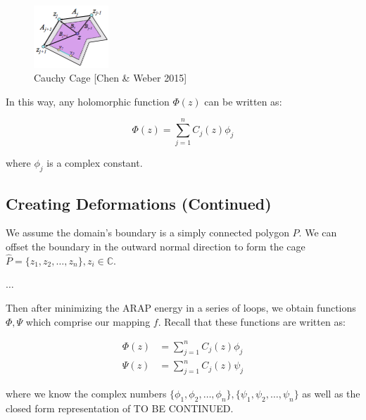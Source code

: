 \begin{figure}[h]
	\centering
	\includegraphics[width=0.25\textwidth]{Images/Cauchy-Cage.png}
	\caption{Cauchy Cage [Chen \& Weber 2015]}
	\label{fig:Cauchy-Cage}
\end{figure}

In this way, any holomorphic function $\Phi(z)$ can be written as:

$$\Phi(z) = \sum_{j=1}^n C_j(z) \phi_j$$

where $\phi_j$ is a complex constant.

\subsection{Creating Deformations (Continued)}

We assume the domain's boundary is a simply connected polygon $P$. We can offset the boundary in the outward normal direction to form the cage $\hat{P} = \{z_1, z_2, \ldots, z_n\}, z_i \in \mathbb{C}$. 

$\ldots$

Then after minimizing the ARAP energy in a series of loops, we obtain functions $\Phi, \Psi$ which comprise our mapping $f$. Recall that these functions are written as:

\begin{align*}
\Phi(z) &= \sum_{j=1}^n C_j(z) \phi_j \\
\Psi(z) &= \sum_{j=1}^n C_j(z) \psi_j
\end{align*}

where we know the complex numbers $\{\phi_1, \phi_2, \ldots, \phi_n\}, \{\psi_1, \psi_2, \ldots, \psi_n\}$ as well as the closed form representation of TO BE CONTINUED.


 
